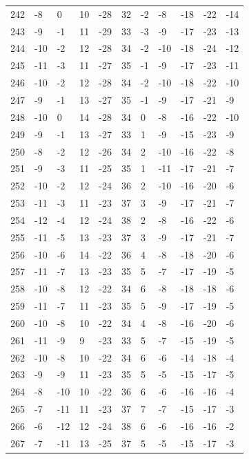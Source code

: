 \begin{table}[H]
\begin{tabular}{lllllllllll}
242 & -8 & 0 & 10 & -28 & 32 & -2 & -8 & -18 & -22 & -14 \\
243 & -9 & -1 & 11 & -29 & 33 & -3 & -9 & -17 & -23 & -13 \\
244 & -10 & -2 & 12 & -28 & 34 & -2 & -10 & -18 & -24 & -12 \\
245 & -11 & -3 & 11 & -27 & 35 & -1 & -9 & -17 & -23 & -11 \\
246 & -10 & -2 & 12 & -28 & 34 & -2 & -10 & -18 & -22 & -10 \\
247 & -9 & -1 & 13 & -27 & 35 & -1 & -9 & -17 & -21 & -9 \\
248 & -10 & 0 & 14 & -28 & 34 & 0 & -8 & -16 & -22 & -10 \\
249 & -9 & -1 & 13 & -27 & 33 & 1 & -9 & -15 & -23 & -9 \\
250 & -8 & -2 & 12 & -26 & 34 & 2 & -10 & -16 & -22 & -8 \\
251 & -9 & -3 & 11 & -25 & 35 & 1 & -11 & -17 & -21 & -7 \\
252 & -10 & -2 & 12 & -24 & 36 & 2 & -10 & -16 & -20 & -6 \\
253 & -11 & -3 & 11 & -23 & 37 & 3 & -9 & -17 & -21 & -7 \\
254 & -12 & -4 & 12 & -24 & 38 & 2 & -8 & -16 & -22 & -6 \\
255 & -11 & -5 & 13 & -23 & 37 & 3 & -9 & -17 & -21 & -7 \\
256 & -10 & -6 & 14 & -22 & 36 & 4 & -8 & -18 & -20 & -6 \\
257 & -11 & -7 & 13 & -23 & 35 & 5 & -7 & -17 & -19 & -5 \\
258 & -10 & -8 & 12 & -22 & 34 & 6 & -8 & -18 & -18 & -6 \\
259 & -11 & -7 & 11 & -23 & 35 & 5 & -9 & -17 & -19 & -5 \\
260 & -10 & -8 & 10 & -22 & 34 & 4 & -8 & -16 & -20 & -6 \\
261 & -11 & -9 & 9 & -23 & 33 & 5 & -7 & -15 & -19 & -5 \\
262 & -10 & -8 & 10 & -22 & 34 & 6 & -6 & -14 & -18 & -4 \\
263 & -9 & -9 & 11 & -23 & 35 & 5 & -5 & -15 & -17 & -5 \\
264 & -8 & -10 & 10 & -22 & 36 & 6 & -6 & -16 & -16 & -4 \\
265 & -7 & -11 & 11 & -23 & 37 & 7 & -7 & -15 & -17 & -3 \\
266 & -6 & -12 & 12 & -24 & 38 & 6 & -6 & -16 & -16 & -2 \\
267 & -7 & -11 & 13 & -25 & 37 & 5 & -5 & -15 & -17 & -3 \\

\end{tabular}
\end{table}
